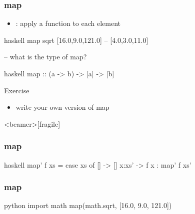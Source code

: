 \documentclass[dvipsnames]{beamer}
\theoremstyle{plain}
\begin{document}
\begin{frame}[fragile]
  \frametitle{map}

  \begin{itemize}
    \item {}: apply a function to each element
  \end{itemize}

  \pause
  \begin{example}[Haskell]
    \begin{pygments}{haskell}
map sqrt [16.0,9.0,121.0]     -- [4.0,3.0,11.0]

-- what is the type of map?
    \end{pygments}

    \pause
    \begin{pygments}{haskell}
map :: (a -> b) -> [a] -> [b]
    \end{pygments}
  \end{example}

  \pause
  \begin{block}{Exercise}
    \begin{itemize}
      \item write your own version of map
    \end{itemize}
  \end{block}
\end{frame}

\begin{frame}<beamer>[fragile]
  \frametitle{map}

  \begin{example}[Haskell]
    \begin{pygments}{haskell}
map' f xs =
    case xs of
      [] -> []
      x:xs' -> f x : map' f xs'
    \end{pygments}
  \end{example}
\end{frame}

\begin{frame}[fragile]
  \frametitle{map}

  \begin{example}[Python]
    \begin{pygments}{python}
import math
map(math.sqrt, [16.0, 9.0, 121.0])
    \end{pygments}
  \end{example}
\end{frame}
\end{document}

